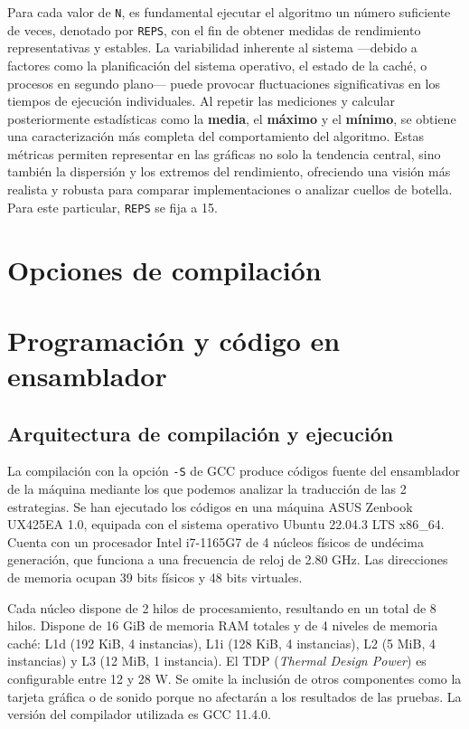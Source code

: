 \documentclass[11pt,a4paper,twoside]{article}
\theoremstyle{definition}
\begin{document}
	Para cada valor de \texttt{N}, es fundamental ejecutar el algoritmo un número suficiente de veces, denotado por \texttt{REPS}, con el fin de obtener medidas de rendimiento representativas y estables. La variabilidad inherente al sistema ---debido a factores como la planificación del sistema operativo, el estado de la caché, o procesos en segundo plano--- puede provocar fluctuaciones significativas en los tiempos de ejecución individuales. Al repetir las mediciones y calcular posteriormente estadísticas como la \textbf{media}, el \textbf{máximo} y el \textbf{mínimo}, se obtiene una caracterización más completa del comportamiento del algoritmo. Estas métricas permiten representar en las gráficas no solo la tendencia central, sino también la dispersión y los extremos del rendimiento, ofreciendo una visión más realista y robusta para comparar implementaciones o analizar cuellos de botella. Para este particular, \texttt{REPS} se fija a 15.
		
	
	\section{Opciones de compilación}

	
	\section{Programación y código en ensamblador}
	
	\subsection{Arquitectura de compilación y ejecución}
	
	La compilación con la opción \texttt{-S} de GCC produce códigos fuente del ensamblador de la máquina mediante los que podemos analizar la traducción de las 2 estrategias. Se han ejecutado los códigos en una máquina ASUS Zenbook UX425EA 1.0, equipada con el sistema operativo Ubuntu 22.04.3 LTS x86\_64. Cuenta con un procesador Intel i7-1165G7 de 4 núcleos físicos de undécima generación, que funciona a una frecuencia de reloj de 2.80 GHz. Las direcciones de memoria ocupan 39 bits físicos y 48 bits virtuales.
	
	Cada núcleo dispone de 2 hilos de procesamiento, resultando en un total de 8 hilos. Dispone de 16 GiB de memoria RAM totales y de 4 niveles de memoria caché: L1d (192 KiB, 4 instancias), L1i (128 KiB, 4 instancias), L2 (5 MiB, 4 instancias) y L3 (12 MiB, 1 instancia). El TDP (\textit{Thermal Design Power}) es configurable entre 12 y 28 W. Se omite la inclusión de otros componentes como la tarjeta gráfica o de sonido porque no afectarán a los resultados de las pruebas. La versión del compilador utilizada es GCC 11.4.0.
\end{document}
